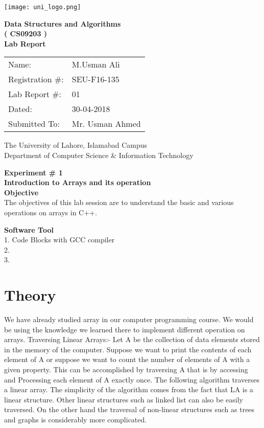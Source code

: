 \documentclass[11pt]{article}            %
\begin{document}
\begin{titlepage}
    \centering
  \vfill
    \texttt{[image: uni\_logo.png]} \\ 
	\vskip2cm
    {\bfseries\Large
	Data Structures and Algorithms \\ ( CS09203 )\\
	
	\vskip2cm
	Lab Report 
	 
	\vskip2cm
	}    

\begin{center}
\begin{tabular}{ l l  } 

Name: & M.Usman Ali \\ 
Registration \#: & SEU-F16-135 \\ 
Lab Report \#: & 01 \\ 
 Dated:& 30-04-2018\\ 
Submitted To:& Mr. Usman Ahmed\\ 

\end{tabular}
\end{center}
    \vfill
    The University of Lahore, Islamabad Campus\\
Department of Computer Science \& Information Technology
\end{titlepage}


    
    {\bfseries\Large
\centering
	Experiment \# 1 \\

Introduction to Arrays and its operation\\
	
	}    
 \vskip1cm
 \textbf {Objective}\\ The objectives of this lab session are to understand the basic and various operations on arrays in C++. 
 
 \textbf {Software Tool}\\
1. Code Blocks with GCC compiler\\
2. \\
3. \\

\section{Theory }              We have already studied array in our computer programming course. We would be using the knowledge we learned there to implement different operation on arrays.
Traversing Linear Arrays:-
Let A be the collection of data elements stored in the memory of the computer. Suppose we want to print the contents of each element of A or suppose we want to count the number of elements of A with a given property. This can be accomplished by traversing A that is by accessing and Processing each element of A exactly once.
The following algorithm traverses a linear array. The simplicity of the algorithm comes from the fact that LA is a linear structure. Other linear structures such as linked list can also be easily traversed. On the other hand the traversal of non-linear structures such as trees and graphs is considerably more complicated.
\end{document}
